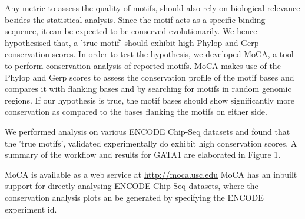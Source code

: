 \documentclass[11pt,a4paper]{article}
\begin{document}
Any metric to assess the quality of motifs, should also rely on biological relevance besides the statistical analysis. 
Since the motif acts as a specific binding sequence, it can be expected to be conserved evolutionarily. We hence hypothesised that, a 'true motif' should exhibit high Phylop\cite{siepel2006new} and Gerp\cite{davydov2010identifying} conservation scores.
In order to test the hypothesis, we developed MoCA, a tool to perform conservation analysis of reported motifs. MoCA makes use of the Phylop and Gerp scores to assess the conservation profile of the motif bases and compares it with flanking bases and by searching for motifs in random genomic regions. If our hypothesis is true, the motif bases should show significantly more conservation as compared to the bases flanking the motifs on either side. 

We performed analysis on various ENCODE Chip-Seq datasets and found that the 'true motifs', validated experimentally do exhibit high conservation scores. A summary of the workflow and results for GATA1 are elaborated in Figure 1.

MoCA is available as a web service at \url{http://moca.usc.edu}
MoCA has an inbuilt support for directly analysing ENCODE Chip-Seq datasets, where the conservation analysis plots an be generated by specifying the ENCODE experiment id. 


\end{document}
